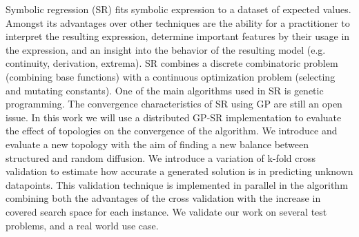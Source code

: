 Symbolic regression (SR) fits symbolic expression to a dataset of expected values.
Amongst its advantages over other techniques are the ability for a practitioner to interpret the resulting expression, determine important features by their usage in the expression, and an insight into the behavior of the resulting model (e.g. continuity, derivation, extrema).
SR combines a discrete combinatoric problem (combining base functions) with a continuous optimization problem (selecting and mutating constants).
One of the main algorithms used in SR is genetic programming. The convergence characteristics of SR using GP are still an open issue.
In this work we will use a distributed GP-SR implementation to evaluate the effect of topologies on the convergence of the algorithm.
We introduce and evaluate a new topology with the aim of finding a new balance between structured and random diffusion.
We introduce a variation of k-fold cross validation to estimate how accurate a generated solution is in predicting unknown datapoints. This validation technique is implemented in parallel in the algorithm combining both the advantages of the cross validation with the increase in covered search space for each instance.
We validate our work on several test problems, and a real world use case.